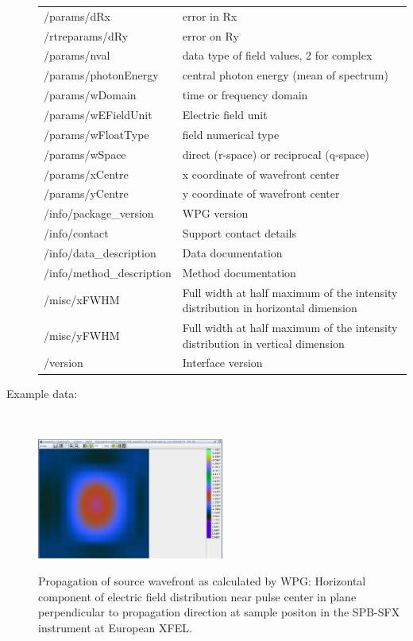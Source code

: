\documentclass[12pt]{scrartcl}
\begin{document}
\begin{description}
{\begin{tabular}{l|l}
  /params/dRx     & error in Rx \\
  /rtreparams/dRy     & error on Ry \\
  /params/nval    &  data type of field values, 2 for complex \\
  /params/photonEnergy    & central photon energy (mean of spectrum) \\
  /params/wDomain     & time or frequency domain\\
  /params/wEFieldUnit     & Electric field unit \\
  /params/wFloatType    &  field numerical type \\
  /params/wSpace    &  direct (r-space) or reciprocal (q-space)\\
  /params/xCentre     & x coordinate of wavefront center \\
  /params/yCentre                 & y coordinate of wavefront center \\
  /info/package\_version          & WPG version \\
  /info/contact        & Support contact details \\
  /info/data\_description         & Data documentation \\
  /info/method\_description       & Method documentation \\
  /misc/xFWHM        & Full width at half maximum of the intensity distribution in horizontal dimension\\
  /misc/yFWHM        & Full width at half maximum of the intensity distribution in
  vertical dimension\\
  /version        & Interface version \\
  \hline
  \hline
\end{tabular}
}
\item[Example data:]\ \\
      \begin{center}
        \includegraphics[width=0.5\textwidth,angle=0,clip]{figures/wpg_demo}
      \end{center}
      \scriptsize{Propagation of source wavefront as calculated by WPG: Horizontal
      component of electric field distribution near pulse center in plane perpendicular to
    propagation direction at sample positon in the SPB-SFX instrument at
    European XFEL.}
\end{description}
\end{document}
